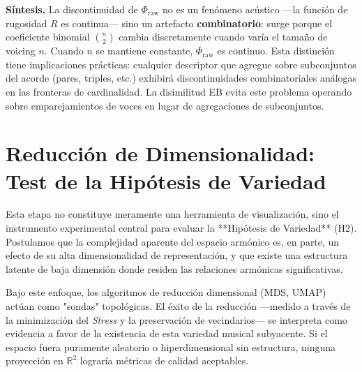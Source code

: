 \textbf{Síntesis.} La discontinuidad de $\Phi_{\text{raw}}$ no es un fenómeno acústico ---la función de rugosidad $R$ es continua--- sino un artefacto \textbf{combinatorio}: surge porque el coeficiente binomial $\binom{n}{2}$ cambia discretamente cuando varía el tamaño de voicing $n$. Cuando $n$ se mantiene constante, $\Phi_{\text{raw}}$ es continuo. Esta distinción tiene implicaciones prácticas: cualquier descriptor que agregue sobre subconjuntos del acorde (pares, triples, etc.) exhibirá discontinuidades combinatoriales análogas en las fronteras de cardinalidad. La disimilitud EB evita este problema operando sobre emparejamientos de voces en lugar de agregaciones de subconjuntos.

\section{Reducción de Dimensionalidad: Test de la Hipótesis de Variedad}
\label{sec:reduccion_dimensionalidad}

Esta etapa no constituye meramente una herramienta de visualización, sino el instrumento experimental central para evaluar la **Hipótesis de Variedad** (H2). Postulamos que la complejidad aparente del espacio armónico es, en parte, un efecto de su alta dimensionalidad de representación, y que existe una estructura latente de baja dimensión donde residen las relaciones armónicas significativas.

Bajo este enfoque, los algoritmos de reducción dimensional (MDS, UMAP) actúan como "sondas" topológicas. El éxito de la reducción —medido a través de la minimización del \textit{Stress} y la preservación de vecindarios— se interpreta como evidencia a favor de la existencia de esta variedad musical subyacente. Si el espacio fuera puramente aleatorio o hiperdimensional sin estructura, ninguna proyección en $\mathbb{R}^2$ lograría métricas de calidad aceptables.

